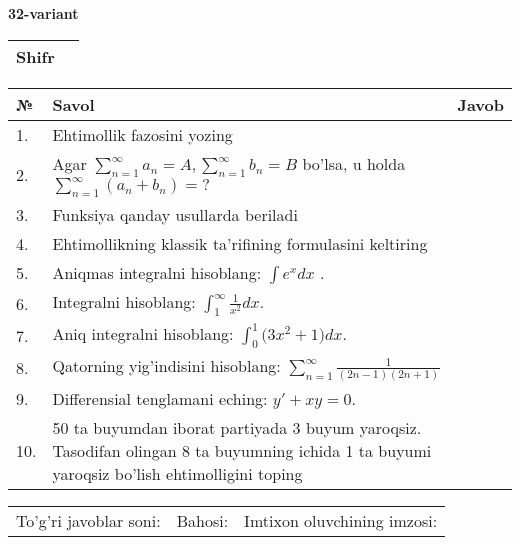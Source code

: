 \documentclass{article}
\begin{document}
  \egroup
  
  \newpage
  
  
  \textbf{32-variant}\\
  
  \bgroup
  \def\arraystretch{1.6} %
  
  \begin{tabular}{|m{5.7cm}|m{9.5cm}|}
  \hline
  Shifr & \\
  \hline
  \end{tabular}
  
  \vspace{1cm}
  
  \begin{tabular}{|m{0.7cm}|m{10cm}|m{4cm}|}
  \hline
  № & Savol & Javob \\
  \hline
  1. & Ehtimollik fazosini yozing &  \\
  \hline
  2. & Agar \(\sum_{n = 1}^{\infty}a_{n} = A,\sum_{n = 1}^{\infty}b_{n} = B\) bo'lsa, u holda \(\sum_{n = 1}^{\infty}\left( a_{n} + b_{n} \right) = ?\) &  \\
  \hline
  3. & Funksiya qanday usullarda beriladi &  \\
  \hline
  4. & Ehtimollikning klassik ta'rifining formulasini keltiring &  \\
  \hline
  5. & Aniqmas integralni hisoblang: \(\int {e^{x}dx}\) . &  \\
  \hline
  6. & Integralni hisoblang: \(\int_{1}^{\infty}{\frac{1}{x^{2}}dx}\). &  \\
  \hline
  7. & Aniq integralni hisoblang: \(\int_{0}^{1}{(3x^{2}} + 1)dx\). &  \\
  \hline
  8. & Qatorning yig'indisini hisoblang: \(\sum_{n = 1}^{\infty}\frac{1}{(2n - 1)(2n + 1)}\) &  \\
  \hline
  9. & Differensial tenglamani eching: \(y' + xy = 0\). &  \\
  \hline
  10. & 50 ta buyumdan iborat partiyada 3 buyum yaroqsiz. Tasodifan olingan 8 ta buyumning ichida 1 ta buyumi yaroqsiz bo'lish ehtimolligini toping &  \\
  \hline
  \end{tabular}
  
  \vspace{1cm}
  
  \begin{tabular}{lll}
  To'g'ri javoblar soni: \underline{\hspace{1.5cm}} & 
  Bahosi: \underline{\hspace{1.5cm}} & 
  Imtixon oluvchining imzosi: \underline{\hspace{2cm}} \\
  \end{tabular}
  
\end{document}
